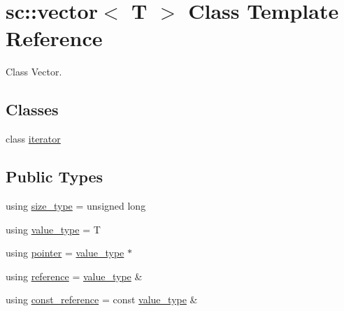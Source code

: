\hypertarget{classsc_1_1vector}{}\section{sc\+:\+:vector$<$ T $>$ Class Template Reference}
\label{classsc_1_1vector}


Class Vector.  


\subsection*{Classes}
\begin{DoxyCompactItemize}
\item 
class \hyperlink{classsc_1_1vector_1_1iterator}{iterator}
\end{DoxyCompactItemize}
\subsection*{Public Types}
\begin{DoxyCompactItemize}
\item 
using \hyperlink{classsc_1_1vector_a48bf37ba1a6d0c13504414d86e27c399}{size\+\_\+type} = unsigned long
\item 
using \hyperlink{classsc_1_1vector_ad37f5bfa688e43c420ed565e4bff6fac}{value\+\_\+type} = T
\item 
using \hyperlink{classsc_1_1vector_a482b9f7edc29ff22ccd2b17a23e37eb4}{pointer} = \hyperlink{classsc_1_1vector_ad37f5bfa688e43c420ed565e4bff6fac}{value\+\_\+type} $\ast$
\item 
using \hyperlink{classsc_1_1vector_a3a0cf48945f82afc95f92710883016d2}{reference} = \hyperlink{classsc_1_1vector_ad37f5bfa688e43c420ed565e4bff6fac}{value\+\_\+type} \&
\item 
using \hyperlink{classsc_1_1vector_af35df3788a0e228d679e7520b2485896}{const\+\_\+reference} = const \hyperlink{classsc_1_1vector_ad37f5bfa688e43c420ed565e4bff6fac}{value\+\_\+type} \&
\end{DoxyCompactItemize}
